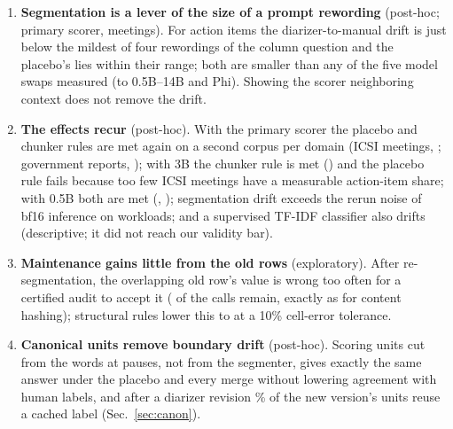 \documentclass[conference]{IEEEtran}
\begin{document}
\begin{enumerate}[leftmargin=*,nosep]
reference scorer's by a median \nOrKeightRef{} as well: the median rise is a property of the query definition (per
meeting the two still differ by a median \nOrKeightEx).
\item \textbf{Segmentation is a lever of the size of a prompt rewording} (post-hoc; primary scorer, meetings). For
action items the diarizer-to-manual drift is just below the mildest of four rewordings of the column question and the
placebo's lies within their range; both are smaller than any of the five model swaps measured (to 0.5B--14B and Phi). Showing the scorer neighboring
context does not remove the drift.
\item \textbf{The effects recur} (post-hoc). With the primary scorer the placebo and chunker rules are met again on a
second corpus per domain (ICSI meetings, \nIcPWtwoAcD; government reports, \nCrsPD); with 3B the chunker rule is met
(\nCrsTD) and the placebo rule fails because too few ICSI meetings have a measurable action-item share; with 0.5B
both are met (\nIcHWtwoAcD, \nCrsHD); segmentation drift exceeds the rerun noise of bf16
inference on \nBfAll{} workloads; and a supervised TF-IDF classifier also drifts (descriptive; it did not reach our validity bar).
\item \textbf{Maintenance gains little from the old rows} (exploratory). After re-segmentation, the overlapping old
row's value is wrong too often for a certified audit to accept it (\nEWonehashshare{} of the calls remain, exactly as
for content hashing); structural rules lower this to \nEWoneechobaseepsonezeroshare{} at a 10\% cell-error tolerance.
\item \textbf{Canonical units remove boundary drift} (post-hoc). Scoring units cut from the words at pauses, not from
the segmenter, gives exactly the same answer under the placebo and every merge without lowering agreement with
human labels, and after a diarizer revision \nCnPReuseWone\% of the new version's units reuse a cached label
(Sec.~\ref{sec:canon}).
\end{enumerate}
\end{document}

